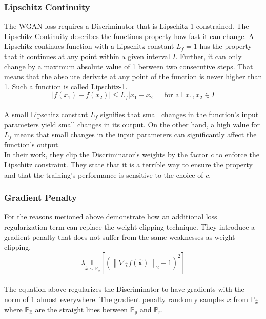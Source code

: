 \subsubsection{Lipschitz Continuity}

The WGAN loss requires a Discriminator that is Lipschitz-1 constrained. The Lipschitz Continuity \cite{Eriksson2004lipschitz} describes the functions property how fast it can change.  A Lipschitz-continues function with a Lipschitz constant $ L_{f}=1 $ has the property that it continues at any point within a given interval $ I $. Further, it can only change by a maximum absolute value of 1 between two consecutive steps. That means that the absolute derivate at any point of the function is never higher than 1. Such a function is called Lipschitz-1.\\

\begin{equation}
    \left|f\left(x_{1}\right)-f\left(x_{2}\right)\right| \leq L_{f}\left|x_{1}-x_{2}\right| \quad \text { for all } x_{1}, x_{2} \in I
\end{equation}\\

A small Lipschitz constant $ L_{f} $ signifies that small changes in the function's input parameters yield small changes in its output. On the other hand, a high value for  $ L_{f} $ means that small changes in the input parameters can significantly affect the function's output.\\

In their work, they clip the Discriminator's weights by the factor $ c $ to enforce the Lipschitz constraint. They state that it is a terrible way to ensure the property and that the training's performance is sensitive to the choice of $ c $.

\subsubsection{Gradient Penalty}

For the reasons metioned above  \cite{gulrajani2017wgangp} \citeauthor{gulrajani2017wgangp} demonstrate how an additional loss regularization term can replace the weight-clipping technique. They introduce a gradient penalty that does not suffer from the same weaknesses as weight-clipping.\\

\begin{equation}
    \lambda \underset{\hat{x} \sim \mathbb{P}_{\hat{x}}}{\mathbb{E}}\left[\left(\left\|\nabla_{\hat{\boldsymbol{x}}} f(\hat{\boldsymbol{x}})\right\|_{2}-1\right)^{2}\right]
\end{equation}\\

The equation above regularizes the Discriminator to have gradients with the norm of 1 almost everywhere. The gradient penalty randomly samples  $ x $ from $ \mathbb{P}_{\hat{x}} $ where $ \mathbb{P}_{\hat{x}} $ are the straight lines between $ \mathbb{P}_{g} $ and $ \mathbb{P}_{r} $.